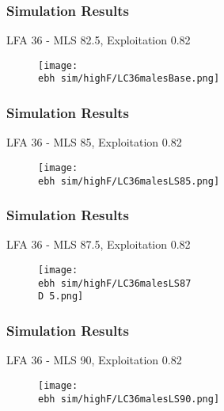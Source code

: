 \documentclass{beamer}
\newcommand{\ebh}{/SpinDr/backup/bio_data/bio.lobster/figures/LFA3438Framework2019/Brad/} %
\newcommand{\D}{.}
\begin{document}

\begin{frame}
\frametitle{Simulation Results}
LFA 36 - MLS 82.5, Exploitation 0.82
\begin{figure}
        \begin{center}
            \texttt{[image: \\ebh sim/highF/LC36malesBase.png]}
        \end{center}
    \end{figure}
\end{frame}



\begin{frame}
\frametitle{Simulation Results}
LFA 36 - MLS 85, Exploitation 0.82
\begin{figure}
        \begin{center}
            \texttt{[image: \\ebh sim/highF/LC36malesLS85.png]}
        \end{center}
    \end{figure}
\end{frame}


\begin{frame}
\frametitle{Simulation Results}
LFA 36 - MLS 87.5, Exploitation 0.82
\begin{figure}
        \begin{center}
            \texttt{[image: \\ebh sim/highF/LC36malesLS87\\D 5.png]}
        \end{center}
    \end{figure}
\end{frame}


\begin{frame}
\frametitle{Simulation Results}
LFA 36 - MLS 90, Exploitation 0.82
\begin{figure}
        \begin{center}
            \texttt{[image: \\ebh sim/highF/LC36malesLS90.png]}
        \end{center}
    \end{figure}
\end{frame}



\end{document}
